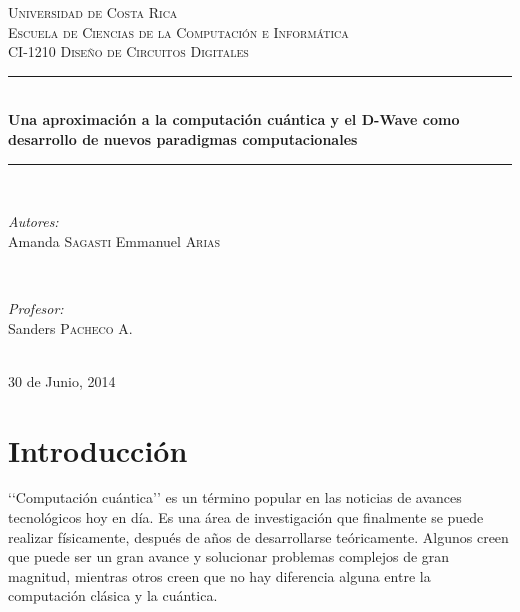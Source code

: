 \documentclass[11pt,a4paper]{article}
\begin{document}
\begin{titlepage}

\newcommand{\HRule}{\rule{\linewidth}{0.5mm}} 

\center

\textsc{\LARGE Universidad de Costa Rica}\\[1.5cm]
\textsc{\Large Escuela de Ciencias de la Computación e Informática}\\[0.5cm] 
\textsc{\large CI-1210 Diseño de Circuitos Digitales}\\[0.5cm] 

\HRule \\[0.4cm]
{ \huge \bfseries Una aproximación a la computación cuántica y el D-Wave como desarrollo de nuevos paradigmas computacionales}\\[0.4cm] %
\HRule \\[1.5cm]

\begin{minipage}{0.4\textwidth}
\begin{flushleft} \large
\emph{Autores:}\\
Amanda \textsc{Sagasti}
Emmanuel \textsc{Arias} 
\end{flushleft}
\end{minipage}
~
\begin{minipage}{0.4\textwidth}
\begin{flushright} \large
\emph{Profesor:} \\
Sanders \textsc{Pacheco A.} %
\end{flushright}
\end{minipage}\\[4cm]

{\large 30 de Junio, 2014}\\[3cm] 

\vfill 

\end{titlepage}



\part*{Introducción}

‘‘Computación cuántica’’ es un término popular en las noticias de avances tecnológicos hoy en día. Es una área de investigación que finalmente se puede realizar físicamente, después de años de desarrollarse teóricamente. Algunos creen que puede ser un gran avance y solucionar problemas complejos de gran magnitud, mientras otros creen que no hay diferencia alguna entre la computación clásica y la cuántica. 
\end{document}
